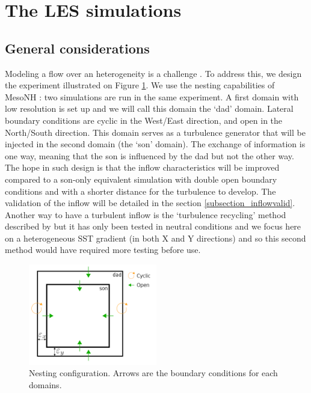\documentclass[draft]{agujournal2019} %
\begin{document}
        
        \section{The LES simulations} 
        \label{subsection_numerical_setup}     
        

            

            \subsection{General considerations}
            \label{subsection_general_principle}
            
            Modeling a flow over an heterogeneity is a challenge \cite{fogarty_how_2024}. To address this, we design the experiment illustrated on Figure \ref{nesting_setup}. We use the nesting capabilities of MesoNH \cite[version 5.7.0]{lac_overview_2018} : two simulations are run in the same experiment. A first domain with low resolution is set up and we will call this domain the `dad' domain. Lateral boundary conditions are cyclic in the West/East direction, and open in the North/South direction. This domain serves as a turbulence generator that will be injected in the second domain (the `son' domain). The exchange of information is one way, meaning that the son is influenced by the dad but not the other way. The hope in such design is that the inflow characteristics will be improved compared to a son-only equivalent simulation with double open boundary conditions and with a shorter distance for the turbulence to develop. The validation of the inflow will be detailed in the section \ref{subsection_inflowvalid}. Another way to have a turbulent inflow is the `turbulence recycling' method described by  but it has only been tested in neutral conditions and we focus here on a heterogeneous SST gradient (in both X and Y directions) and so this second method would have required more testing before use.

            \begin{figure}[h]
				\centering
				\includegraphics[width=0.5\textwidth]{Nesting_setup_modified.png}
				\caption{Nesting configuration. Arrows are the boundary conditions for each domains.}
				\label{nesting_setup}
			\end{figure}
\end{document}
